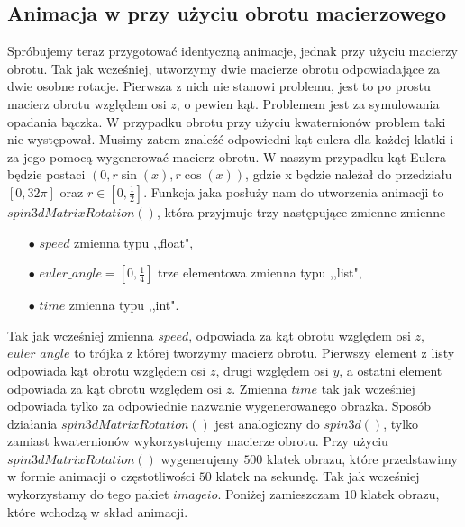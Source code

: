 \documentclass[a4paper,twoside,11pt,reqno]{mwrep}
\theoremstyle{plain} \newtheorem{twr}{Twierdzenie}
\theoremstyle{plain} \newtheorem{lem}{Lemat}
\theoremstyle{definition} \newtheorem{defi}{Definicja}
\theoremstyle{remark} \newtheorem*{wni}{Wniosek}
\theoremstyle{definition} \newtheorem{uwaga}{Uwaga}
\theoremstyle{definition}\newtheorem{prz}{Przykład}
\begin{document}
\subsection{Animacja w przy użyciu obrotu macierzowego}
Spróbujemy teraz przygotować identyczną animacje, jednak przy użyciu macierzy obrotu.
Tak jak wcześniej, utworzymy dwie macierze obrotu odpowiadające za dwie osobne rotacje.
Pierwsza z nich nie stanowi problemu, jest to po prostu macierz obrotu względem osi $z$, 
o pewien kąt. Problemem jest za symulowania opadania bączka. W przypadku obrotu
przy użyciu kwaternionów problem taki nie występował. Musimy zatem znaleźć odpowiedni kąt eulera dla każdej klatki i za jego pomocą wygenerować macierz obrotu.  
W naszym przypadku kąt Eulera będzie postaci 
$(0,r\sin(x),r\cos(x))$, gdzie x będzie należał do przedziału $[0,32\pi]$ oraz 
$r \in \left[0,\frac{1}{2}\right]$. 
Funkcja jaka posłuży nam do utworzenia animacji to $spin3dMatrixRotation()$, która przyjmuje 
trzy następujące zmienne zmienne
\begin{itemize}
\item[$\bullet$] $speed$ zmienna typu ,,float",
\item[$\bullet$] $euler\_angle = \left[0,\frac{1}{4}\right]$ trze elementowa zmienna typu ,,list",
\item[$\bullet$] $time$ zmienna typu ,,int".
\end{itemize}
Tak jak wcześniej zmienna $speed$, odpowiada za kąt obrotu względem osi $z$, 
$euler\_angle$ to trójka z której tworzymy macierz obrotu. Pierwszy element z listy odpowiada
kąt obrotu względem osi $z$, drugi względem osi $y$, a ostatni element odpowiada za kąt obrotu
względem osi $z$.  Zmienna $time$ tak jak wcześniej odpowiada tylko za odpowiednie nazwanie wygenerowanego obrazka. Sposób działania $spin3dMatrixRotation()$ jest analogiczny do $spin3d()$,
tylko zamiast kwaternionów wykorzystujemy macierze obrotu.
Przy użyciu $spin3dMatrixRotation()$ wygenerujemy $500$ klatek obrazu, które
przedstawimy w formie animacji o częstotliwości $50$ klatek na sekundę.
Tak jak wcześniej wykorzystamy do tego pakiet $imageio$.
Poniżej zamieszczam $10$ klatek obrazu, które wchodzą w skład animacji.
\newpage
\end{document}
